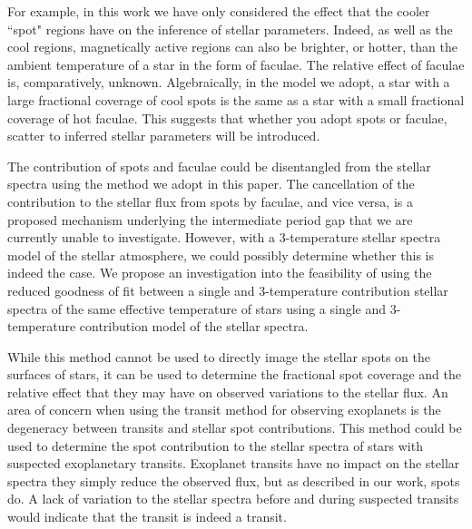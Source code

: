 For example, in this work we have only considered the effect that the cooler ``spot" regions have on the inference of stellar parameters.
Indeed, as well as the cool regions, magnetically active regions can also be brighter, or hotter, than the ambient temperature of a star in the form of faculae.
The relative effect of faculae is, comparatively, unknown.
Algebraically, in the model we adopt, a star with a large fractional coverage of cool spots is the same as a star with a small fractional coverage of hot faculae.
This suggests that whether you adopt spots or faculae, scatter to inferred stellar parameters will be introduced.

The contribution of spots and faculae could be disentangled from the stellar spectra using the method we adopt in this paper.
The cancellation of the contribution to the stellar flux from spots by faculae, and vice versa, is a proposed mechanism underlying the intermediate period gap that we are currently unable to investigate.
However, with a 3-temperature stellar spectra model of the stellar atmosphere, we could possibly determine whether this is indeed the case.
We propose an investigation into the feasibility of using the reduced goodness of fit between a single and 3-temperature contribution stellar spectra of the same effective temperature of stars using a single and 3-temperature contribution model of the stellar spectra.

While this method cannot be used to directly image the stellar spots on the surfaces of stars, it can be used to determine the fractional spot coverage and the relative effect that they may have on observed variations to the stellar flux.
An area of concern when using the transit method for observing exoplanets is the degeneracy between transits and stellar spot contributions.
This method could be used to determine the spot contribution to the stellar spectra of stars with suspected exoplanetary transits.
Exoplanet transits have no impact on the stellar spectra they simply reduce the observed flux, but as described in our work, spots do.
A lack of variation to the stellar spectra before and during suspected transits would indicate that the transit is indeed a transit.

